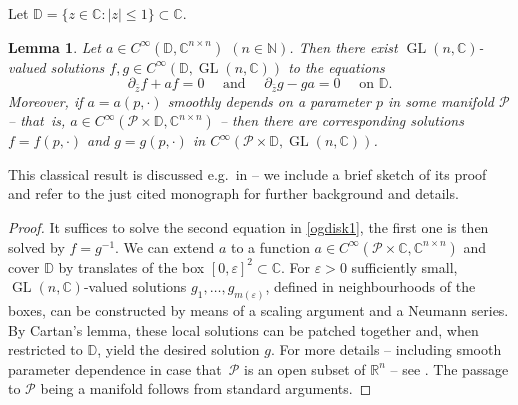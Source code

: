 \documentclass[JEP,XML,SOM,Unicode,published]{cedram}
\let\epsilon\varepsilon
\DeclareMathOperator{\GL}{GL}
\theoremstyle{plain}
\newtheorem{lemma}[theorem]{Lemma}
\theoremstyle{definition}
\newcommand{\N}{\mathbb{N}}
\newcommand{\R}{\mathbb{R}}
\newcommand{\C}{\mathbb{C}}
\newcommand{\DD}{\mathbb{D}}
\newcommand{\1}{{\bf 1}}
\begin{document}
Let $\DD=\{z\in \C: \vert z \vert \le 1\}\subset \C$.

\begin{lemma}\label{ogdisk} Let $a\in C^\infty(\DD,\C^{n\times n})$ $(n\in \N)$. Then there exist $\GL(n,\C)$-valued solutions $f,g\in C^\infty(\DD,\GL(n,\C))$ to the equations
\begin{equation}\label{ogdisk1}
\partial_{\bar z} f + a f = 0 \quad \text{ and } \quad \partial_{\bar z}g - g a = 0 \quad \text{ on } \DD.
\end{equation}
Moreover, if $a=a(p,\cdot)$ smoothly depends on a parameter $p$ in some manifold $\mathcal{P}$ -- that~is, $a\in C^\infty( \mathcal{P}\times \DD,\C^{n\times n})$ -- then there are corresponding solutions $f=f(p,\cdot)$ and $g=g(p,\cdot)$ in $C^\infty(\mathcal{P} \times \DD,\GL(n,\C))$.
\end{lemma}

This classical result is discussed e.g.~in \cite{Mal84} -- we include a brief sketch of its proof and refer to the just cited monograph for further background and details.

\begin{proof}[Proof]
It suffices to solve the second equation in \eqref{ogdisk1}, the first one is then solved by $f=g^{-1}$. We can extend $a$ to a function $a\in C^\infty(\mathcal{P}\times \C,\C^{n\times n})$ and cover $\DD$ by translates of the box $[0,\epsilon]^2\subset \C$. For $\epsilon>0$ sufficiently small, $\GL(n,\C)$-valued solutions $g_1,\dots,g_{m(\epsilon)}$, defined in neighbourhoods of the boxes, can be constructed by means of a scaling argument and a Neumann series. By Cartan's lemma, these local solutions can be patched together and, when restricted to $\DD$, yield the desired solution $g$. For more details -- including smooth parameter dependence in case that~$\mathcal{P}$ is an open subset of $\R^n$ -- see \cite[Th.\,1, p.\,66]{Mal84}. The passage to $\mathcal{P}$ being a manifold follows from standard arguments.
\end{proof}

\backmatter


\end{document}
